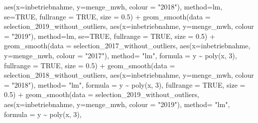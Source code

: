 \documentclass[a4paper,11pt]{article}
\newenvironment{Shaded}{\begin{snugshade}}{\end{snugshade}}
\newcommand{\AttributeTok}[1]{\textcolor[rgb]{0.77,0.63,0.00}{#1}}
\newcommand{\ConstantTok}[1]{\textcolor[rgb]{0.00,0.00,0.00}{#1}}
\newcommand{\DecValTok}[1]{\textcolor[rgb]{0.00,0.00,0.81}{#1}}
\newcommand{\FloatTok}[1]{\textcolor[rgb]{0.00,0.00,0.81}{#1}}
\newcommand{\FunctionTok}[1]{\textcolor[rgb]{0.00,0.00,0.00}{#1}}
\newcommand{\NormalTok}[1]{#1}
\newcommand{\SpecialCharTok}[1]{\textcolor[rgb]{0.00,0.00,0.00}{#1}}
\newcommand{\StringTok}[1]{\textcolor[rgb]{0.31,0.60,0.02}{#1}}
\begin{document}
\begin{Shaded}
\begin{Highlighting}[]
              \FunctionTok{aes}\NormalTok{(}\AttributeTok{x=}\NormalTok{inbetriebnahme, }\AttributeTok{y=}\NormalTok{menge\_mwh, }\AttributeTok{colour =} \StringTok{"2018"}\NormalTok{), }
              \AttributeTok{method=}\NormalTok{lm, }\AttributeTok{se=}\ConstantTok{TRUE}\NormalTok{, }\AttributeTok{fullrange =} \ConstantTok{TRUE}\NormalTok{, }\AttributeTok{size =} \FloatTok{0.5}\NormalTok{)  }\SpecialCharTok{+}
  \FunctionTok{geom\_smooth}\NormalTok{(}\AttributeTok{data =}\NormalTok{ selection\_2019\_without\_outliers, }
              \FunctionTok{aes}\NormalTok{(}\AttributeTok{x=}\NormalTok{inbetriebnahme, }\AttributeTok{y=}\NormalTok{menge\_mwh, }\AttributeTok{colour =} \StringTok{"2019"}\NormalTok{), }
              \AttributeTok{method=}\NormalTok{lm, }\AttributeTok{se=}\ConstantTok{TRUE}\NormalTok{, }\AttributeTok{fullrange =} \ConstantTok{TRUE}\NormalTok{, }\AttributeTok{size =} \FloatTok{0.5}\NormalTok{)  }\SpecialCharTok{+}
  \FunctionTok{geom\_smooth}\NormalTok{(}\AttributeTok{data =}\NormalTok{ selection\_2017\_without\_outliers, }
              \FunctionTok{aes}\NormalTok{(}\AttributeTok{x=}\NormalTok{inbetriebnahme, }\AttributeTok{y=}\NormalTok{menge\_mwh, }\AttributeTok{colour =} \StringTok{"2017"}\NormalTok{), }
              \AttributeTok{method=} \StringTok{"lm"}\NormalTok{, }\AttributeTok{formula =}\NormalTok{ y }\SpecialCharTok{\textasciitilde{}} \FunctionTok{poly}\NormalTok{(x, }\DecValTok{3}\NormalTok{), }
              \AttributeTok{fullrange =} \ConstantTok{TRUE}\NormalTok{, }\AttributeTok{size =} \FloatTok{0.5}\NormalTok{)  }\SpecialCharTok{+}
  \FunctionTok{geom\_smooth}\NormalTok{(}\AttributeTok{data =}\NormalTok{ selection\_2018\_without\_outliers, }
              \FunctionTok{aes}\NormalTok{(}\AttributeTok{x=}\NormalTok{inbetriebnahme, }\AttributeTok{y=}\NormalTok{menge\_mwh, }\AttributeTok{colour =} \StringTok{"2018"}\NormalTok{),}
              \AttributeTok{method=} \StringTok{"lm"}\NormalTok{, }\AttributeTok{formula =}\NormalTok{ y }\SpecialCharTok{\textasciitilde{}} \FunctionTok{poly}\NormalTok{(x, }\DecValTok{3}\NormalTok{), }
              \AttributeTok{fullrange =} \ConstantTok{TRUE}\NormalTok{, }\AttributeTok{size =} \FloatTok{0.5}\NormalTok{)  }\SpecialCharTok{+}
  \FunctionTok{geom\_smooth}\NormalTok{(}\AttributeTok{data =}\NormalTok{ selection\_2019\_without\_outliers, }
              \FunctionTok{aes}\NormalTok{(}\AttributeTok{x=}\NormalTok{inbetriebnahme, }\AttributeTok{y=}\NormalTok{menge\_mwh, }\AttributeTok{colour =} \StringTok{"2019"}\NormalTok{), }
              \AttributeTok{method=} \StringTok{"lm"}\NormalTok{, }\AttributeTok{formula =}\NormalTok{ y }\SpecialCharTok{\textasciitilde{}} \FunctionTok{poly}\NormalTok{(x, }\DecValTok{3}\NormalTok{), }

\end{Highlighting}
\end{Shaded}
\end{document}
